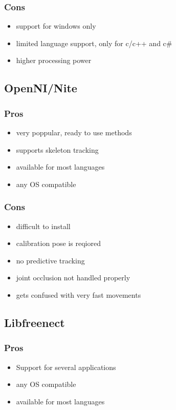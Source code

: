 \documentclass[a4paper,10pt]{report}
\begin{document}
\subsubsection{Cons}
\begin{itemize}
 \item support for windows only
 \item limited language support, only for c/c++ and c#
 \item higher processing power
\end{itemize}

\subsection{OpenNI/Nite}
\subsubsection{Pros}
\begin{itemize}
 \item very poppular, ready to use methods
 \item supports skeleton tracking
 \item available for most languages
 \item any OS compatible
\end{itemize}
\subsubsection{Cons}
\begin{itemize}
 \item difficult to install
 \item calibration pose is reqiored
 \item no predictive tracking
 \item joint occlusion not handled properly
 \item gets confused with very fast movements
\end{itemize}

\subsection{Libfreenect}
\subsubsection{Pros}
\begin{itemize}
 \item Support for several applications
 \item any OS compatible
 \item available for most languages
\end{itemize}
\end{document}

